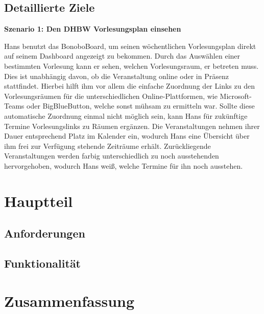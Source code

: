 \documentclass[a4paper,11pt]{scrartcl}
\begin{document}

	\subsection{Detaillierte Ziele} %

\textbf{Szenario 1: Den DHBW Vorlesungsplan einsehen}\par\noindent
Hans benutzt das BonoboBoard, um seinen wöchentlichen Vorlesungsplan direkt auf seinem Dashboard angezeigt zu bekommen. Durch das Auswählen einer bestimmten Vorlesung kann er sehen, welchen Vorlesungsraum, er betreten muss. Dies ist unabhängig davon, ob die Veranstaltung online oder in Präsenz stattfindet. Hierbei hilft ihm vor allem die einfache Zuordnung der Links zu den Vorlesungsräumen für die unterschiedlichen Online-Plattformen, wie Microsoft-Teams oder BigBlueButton, welche sonst mühsam zu ermitteln war. Sollte diese automatische Zuordnung einmal nicht möglich sein, kann Hans für zukünftige Termine Vorlesungslinks zu Räumen ergänzen. Die Veranstaltungen nehmen ihrer Dauer entsprechend Platz im Kalender ein, wodurch Hans eine Übersicht über ihm frei zur Verfügung stehende Zeiträume erhält. Zurückliegende Veranstaltungen werden farbig unterschiedlich zu noch ausstehenden hervorgehoben, wodurch Hans weiß, welche Termine für ihn noch ausstehen.


\section{Hauptteil}
	\subsection{Anforderungen} %
	
	\subsection{Funktionalität} %
	
\section{Zusammenfassung}



\end{document}
